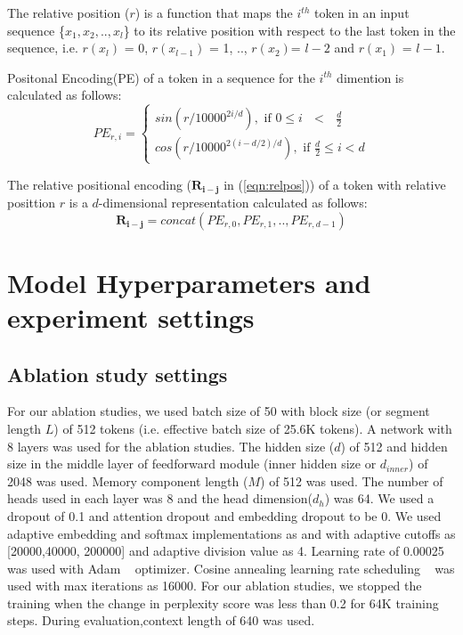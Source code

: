 \documentclass[11pt]{article}
\begin{document}
The relative position ($r$) is a function that maps the $i^{th}$ token in an input sequence \{$x_1, x_2,.., x_l$\} to its relative position with respect to the last token in the sequence, i.e. $r(x_l)$ = 0, $r(x_{l-1})$ = 1, .., $r(x_2)$= $l-2$ and $r(x_1)$ = $l-1$.



Positonal Encoding(PE) of a token in a sequence for the $i^{th}$ dimention is calculated as follows:
\begin{equation}
\label{eqn:PE}
    PE_{r, i}= 
    \begin{cases}
        sin (r/ 10000^{2i/ d}) , \text{ if }  0 \leq i \text{ } < \text{ } \frac{d}{2} \\
        cos (r/ 10000^{2(i- d/2)/ d}) , \text{ if } \frac{d}{2} \leq i < d
    \end{cases}
\end{equation}


The relative positional encoding ($\mathbf{R_{i-j}}$ in (\ref{eqn:relpos})) of a token with relative posittion $r$ is a $d$-dimensional representation calculated as follows:
\begin{equation}
\label{eqn:relPE}
    \mathbf{R_{i-j}} = concat(PE_{r, 0}, PE_{r, 1}, . . , PE_{r, d-1}) 
\end{equation}






\section{Model Hyperparameters and
experiment settings}
\label{appendix:params}

\subsection{Ablation study settings}
For our ablation studies, we used batch size of 50 with block size (or segment length $L$) of 512 tokens (i.e. effective batch size of 25.6K tokens). A network with 8 layers was used for the ablation studies. The hidden size ($d$) of 512 and hidden size in the middle layer of feedforward module (inner hidden size or $d_{inner}$) of 2048 was used. Memory component length ($M$) of 512 was used. The number of heads used in each layer was 8 and the head dimension($d_h$) was 64. We used a dropout of 0.1 and attention dropout and embedding dropout to be 0. We used adaptive embedding and softmax implementations as \citet{DBLP:conf/iclr/BaevskiA19} and \citet{DBLP:conf/icml/GraveJCGJ17} with adaptive cutoffs as [20000,40000, 200000] and adaptive division value as 4. Learning rate of 0.00025 was used with Adam ~\citep{DBLP:journals/corr/KingmaB14} optimizer. Cosine annealing learning rate scheduling ~\citep{DBLP:conf/iclr/LoshchilovH17} was used  with max iterations as 16000. For our ablation studies, we stopped the training when the change in perplexity score was less than 0.2 for 64K training steps. During evaluation,context length of 640 was used.
\end{document}
